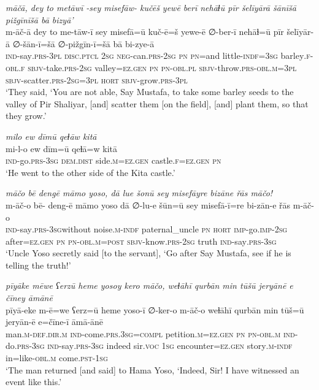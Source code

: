 \ea \label{ŽP.27}
\textit{māčā, dey to metāwī -sey misefāw- kučēš yewē berī nehāɫū pīr šelīyārā šānīšā pižgīnīšā bā bizyā’} \\ 
\gll m-āč-ā dey to me-tāw-ī sey misefā=ū kuč-ē=š yewe-ē ∅-ber-ī nehāɫ=ū pīr šelīyār-ā ∅-šān-ī=šā ∅-pižgīn-ī=šā bā bi-zye-ā \\ 
 \textsc{ind-}say\textsc{.prs}\textsc{-3pl} \textsc{disc.ptcl} \textsc{2sg} \textsc{neg-}can\textsc{.prs}-\textsc{2sg} \textsc{pn} \textsc{pn}=and little\textsc{-indf}\textsc{=3sg} barley\textsc{.f}\textsc{-obl}\textsc{.f} \textsc{sbjv-}take\textsc{.prs}-\textsc{2sg} valley\textsc{\textsc{=ez.gen}} \textsc{pn} \textsc{pn}\textsc{-obl}\textsc{.pl} \textsc{sbjv-}throw\textsc{.prs}\textsc{-obl}\textsc{.m}\textsc{=3pl} \textsc{sbjv-}scatter\textsc{.prs}-\textsc{2sg}\textsc{=3pl} \textsc{hort} \textsc{sbjv-}grow\textsc{.prs}\textsc{-3pl} \\ 
\glt `They said, ‘You are not able, Say Mustafa, to take some barley seeds to the valley of Pir Shaliyar, [and] scatter them [on the field], [and] plant them, so that they grow.'
\z 
 
\ea \label{ŽP.31}
\textit{milo ew dīmū qeɫāw kitā} \\ 
\gll mi-l-o ew dīm=ū qeɫā=w kitā \\ 
 \textsc{ind-}go\textsc{.prs}\textsc{-3sg} \textsc{dem.dist} side\textsc{.m}\textsc{\textsc{=ez.gen}} castle\textsc{.f}\textsc{\textsc{=ez.gen}} \textsc{pn} \\ 
\glt `He went to the other side of the Kita castle.'
\z 
 
\ea \label{ŽP.43}
\textit{māčo bē dengē māmo yoso, dā lue šonū sey misefāyre bizāne řās māčo!} \\ 
\gll m-āč-o bē- deng-ē māmo yoso dā ∅-lu-e šūn=ū sey misefā-ī=re bi-zān-e řās m-āč-o \\ 
 \textsc{ind-}say\textsc{.prs}\textsc{-3sg}without noise\textsc{.m}\textsc{-indf} paternal\_uncle \textsc{pn} \textsc{hort} \textsc{imp-}go.\textsc{imp-}\textsc{2sg} after\textsc{\textsc{=ez.gen}} \textsc{pn} \textsc{pn}\textsc{-obl}\textsc{.m}\textsc{=\textsc{post}} \textsc{sbjv-}know\textsc{.prs}-\textsc{2sg} truth \textsc{ind-}say\textsc{.prs}\textsc{-3sg} \\ 
\glt `Uncle Yoso secretly said [to the servant], ‘Go after Say Mustafa, see if he is telling the truth!'
\z 
 
\ea \label{ŽP.57}
\textit{pīyāke mēwe ʕerzū heme yosoy kero māčo, weɫāhī qurbān min tūšū jeryānē e čīney āmānē} \\ 
\gll pīyā-eke m-ē=we ʕerz=ū heme yoso-ī ∅-ker-o m-āč-o weɫāhī qurbān min tūš=ū jeryān-ē e=čīne-ī āmā-ānē \\ 
 man\textsc{.m}\textsc{-def}\textsc{.dir}\textsc{.m} \textsc{ind-}come\textsc{.prs}\textsc{.3sg}\textsc{=compl} petition\textsc{.m}\textsc{\textsc{=ez.gen}} \textsc{pn} \textsc{pn}\textsc{-obl}\textsc{.m} \textsc{ind-}do\textsc{.prs}\textsc{-3sg} \textsc{ind-}say\textsc{.prs}\textsc{-3sg} indeed sir.\textsc{voc} \textsc{1sg} encounter\textsc{\textsc{=ez.gen}} story\textsc{.m}\textsc{-indf} in=like\textsc{-obl}\textsc{.m} come\textsc{.pst}\textsc{-\textsc{1sg}} \\ 
\glt `The man returned [and said] to Hama Yoso, ‘Indeed, Sir! I have witnessed an event like this.'
\z 
 
